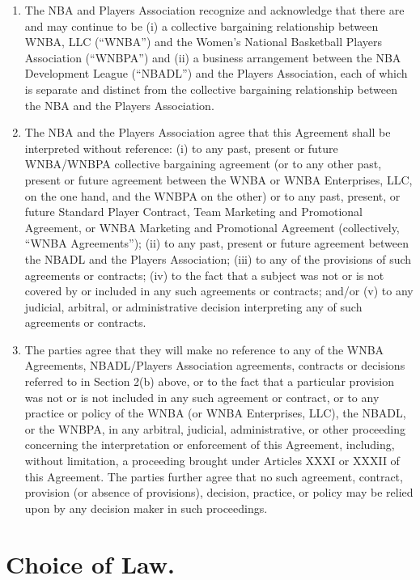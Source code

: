 \documentclass[
]{book}
\providecommand{\tightlist}{%
  \setlength{\itemsep}{0pt}\setlength{\parskip}{0pt}}
\begin{document}
\begin{enumerate}
\def\labelenumi{(\alph{enumi})}
\tightlist
\item
  The NBA and Players Association recognize and acknowledge that there are and may continue to be (i) a collective bargaining relationship between WNBA, LLC (``WNBA'') and the Women's National Basketball Players Association (``WNBPA'') and (ii) a business arrangement between the NBA Development League (``NBADL'') and the Players Association, each of which is separate and distinct from the collective bargaining relationship between the NBA and the Players Association.
\item
  The NBA and the Players Association agree that this Agreement shall be interpreted without reference: (i) to any past, present or future WNBA/WNBPA collective bargaining agreement (or to any other past, present or future agreement between the WNBA or WNBA Enterprises, LLC, on the one hand, and the WNBPA on the other) or to any past, present, or future Standard Player Contract, Team Marketing and Promotional Agreement, or WNBA Marketing and Promotional Agreement (collectively, ``WNBA Agreements''); (ii) to any past, present or future agreement between the NBADL and the Players Association; (iii) to any of the provisions of such agreements or contracts; (iv) to the fact that a subject was not or is not covered by or included in any such agreements or contracts; and/or (v) to any judicial, arbitral, or administrative decision interpreting any of such agreements or contracts.
\item
  The parties agree that they will make no reference to any of the WNBA Agreements, NBADL/Players Association agreements, contracts or decisions referred to in Section 2(b) above, or to the fact that a particular provision was not or is not included in any such agreement or contract, or to any practice or policy of the WNBA (or WNBA Enterprises, LLC), the NBADL, or the WNBPA, in any arbitral, judicial, administrative, or other proceeding concerning the interpretation or enforcement of this Agreement, including, without limitation, a proceeding brought under Articles XXXI or XXXII of this Agreement. The parties further agree that no such agreement, contract, provision (or absence of provisions), decision, practice, or policy may be relied upon by any decision maker in such proceedings.
\end{enumerate}

\hypertarget{choice-of-law.}{%
\section{Choice of Law.}\label{choice-of-law.}}
\end{document}
